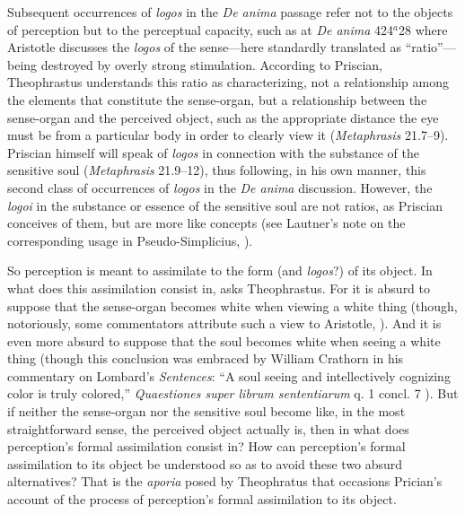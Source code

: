 \documentclass[12pt]{article}
\begin{document}
Subsequent occurrences of \emph{logos} in the \emph{De anima} passage refer not to the objects of perception but to the perceptual capacity, such as at \emph{De anima} 424\( ^{a} \)28 where Aristotle discusses the \emph{logos} of the sense---here standardly translated as ``ratio''---being destroyed by overly strong stimulation. According to Priscian, Theophrastus understands this ratio as characterizing, not a relationship among the elements that constitute the sense-organ, but a relationship between the sense-organ and the perceived object, such as the appropriate distance the eye must be from a particular body in order to clearly view it (\emph{Metaphrasis} 21.7--9). Priscian himself will speak of \emph{logos} in connection with the substance of the sensitive soul (\emph{Metaphrasis} 21.9--12), thus following, in his own manner, this second class of occurrences of \emph{logos} in the \emph{De anima} discussion. However, the \emph{logoi} in the substance or essence of the sensitive soul are not ratios, as Priscian conceives of them, but are more like concepts (see Lautner's note on the corresponding usage in Pseudo-Simplicius, \citealt[214 n.14]{Sorabji:1997ly}).

So perception is meant to assimilate to the form (and \emph{logos}?) of its object. In what does this assimilation consist in, asks Theophrastus. For it is absurd to suppose that the sense-organ becomes white when viewing a white thing (though, notoriously, some commentators attribute such a view to Aristotle, \citealt{Slakey:1961ss, Sorabji:1974fk,Everson:1997ep}). And it is even more absurd to suppose that the soul becomes white when seeing a white thing (though this conclusion was embraced by William Crathorn in his commentary on Lombard's \emph{Sentences}: ``A soul seeing and intellectively cognizing color is truly colored,'' \emph{Quaestiones super librum sententiarum} q. 1 concl. 7 \citealt[288]{Pasnau:2002pb}). But if neither the sense-organ nor the sensitive soul become like, in the most straightforward sense, the perceived object actually is, then in what does perception's formal assimilation consist in? How can perception's formal assimilation to its object be understood so as to avoid these two absurd alternatives? That is the \emph{aporia} posed by Theophratus that occasions Prician's account of the process of perception's formal assimilation to its object.
\end{document}
